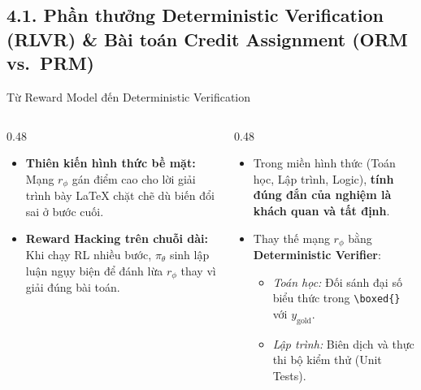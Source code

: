 
\subsection{4.1. Phần thưởng Deterministic Verification (RLVR) \& Bài toán Credit Assignment (ORM vs.\ PRM)}

\begin{frame}{Từ Reward Model đến Deterministic Verification}
  \begin{columns}[T,onlytextwidth]
    \begin{column}{0.48\textwidth}
      \small
      \begin{itemize}\setlength{\itemsep}{4pt}
        \item \textbf{Thiên kiến hình thức bề mặt:} Mạng $r_\phi$ gán điểm cao cho lời giải trình bày LaTeX chặt chẽ dù biến đổi sai ở bước cuối.
        \item \textbf{Reward Hacking trên chuỗi dài:} Khi chạy RL nhiều bước, $\pi_\theta$ sinh lập luận ngụy biện để đánh lừa $r_\phi$ thay vì giải đúng bài toán.
      \end{itemize}
    \end{column}
    \begin{column}{0.48\textwidth}
      \small
      \begin{itemize}\setlength{\itemsep}{4pt}
        \item Trong miền hình thức (Toán học, Lập trình, Logic), \textbf{tính đúng đắn của nghiệm là khách quan và tất định}.
        \item Thay thế mạng $r_\phi$ bằng \textbf{Deterministic Verifier}:
          \begin{itemize}\footnotesize\setlength{\itemsep}{3pt}
            \item \textit{Toán học:} Đối sánh đại số biểu thức trong \texttt{\textbackslash boxed\{\}} với $y_{\text{gold}}$.
            \item \textit{Lập trình:} Biên dịch và thực thi bộ kiểm thử (Unit Tests).
          \end{itemize}
      \end{itemize}
    \end{column}
  \end{columns}
  \par\vspace{0pt}
\end{frame}

